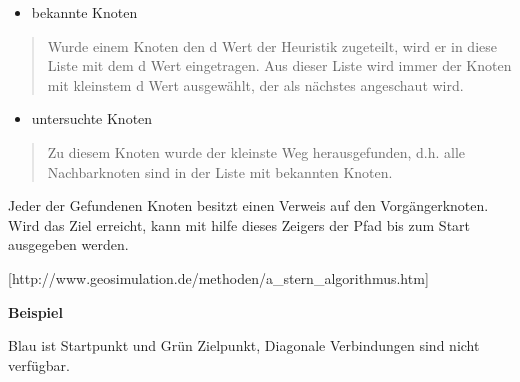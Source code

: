 \begin{itemize}
\item
  bekannte Knoten
\end{itemize}

\begin{quote}
Wurde einem Knoten den d Wert der Heuristik zugeteilt, wird er in diese
Liste mit dem d Wert eingetragen. Aus dieser Liste wird immer der Knoten
mit kleinstem d Wert ausgewählt, der als nächstes angeschaut wird.
\end{quote}

\begin{itemize}
\item
  untersuchte Knoten
\end{itemize}

\begin{quote}
Zu diesem Knoten wurde der kleinste Weg herausgefunden, d.h. alle
Nachbarknoten sind in der Liste mit bekannten Knoten.
\end{quote}

Jeder der Gefundenen Knoten besitzt einen Verweis auf den
Vorgängerknoten. Wird das Ziel erreicht, kann mit hilfe dieses Zeigers
der Pfad bis zum Start ausgegeben werden.

{[}http://www.geosimulation.de/methoden/a\_stern\_algorithmus.htm{]}

\textbf{Beispiel}

Blau ist Startpunkt und Grün Zielpunkt, Diagonale Verbindungen sind
nicht verfügbar.

